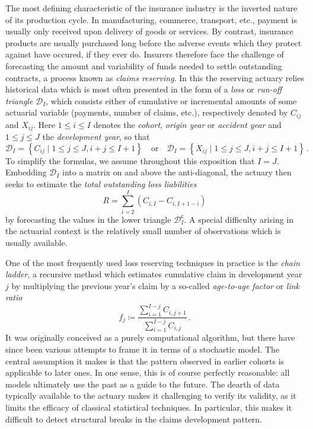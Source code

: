 \documentclass[a4paper]{book}
\theoremstyle{plain}
\begin{document}
The most defining characteristic of the insurance industry is the inverted nature of its production cycle. In manufacturing, commerce, transport, etc., payment is usually only received upon delivery of goods or services. By contrast, insurance products are usually purchased long before the adverse events which they protect against have occured, if they ever do. Insurers therefore face the challenge of forecasting the amount and variability of funds needed to settle outstanding contracts, a process known as \emph{claims reserving}. In this the reserving actuary relies historical data which is most often presented in the form of a \emph{loss} or \emph{run-off triangle} $\mathcal{D}_I$, which consists either of cumulative or incremental amounts of some actuarial variable (payments, number of claims, etc.), respectively denoted by $C_{ij}$ and $X_{ij}$. Here $1 \leq i \leq I$ denotes the \emph{cohort}, \emph{origin year} or \emph {accident year} and $1 \leq j \leq J$ the \emph{development year}, so that
\begin{equation}
    \mathcal{D}_I = \left  \{ C_{ij} \mid 1 \leq j \leq J, i + j \leq I + 1 \right \} 
    \quad \text{or} \quad 
    \mathcal{D}_I = \left  \{ X_{ij} \mid 1 \leq j \leq J, i + j \leq I + 1 \right \} \,.
\end{equation}
To simplify the formulas, we assume throughout this exposition that $I = J$. Embedding $\mathcal{D}_I$ into a matrix on and above the anti-diagonal, the actuary then seeks to estimate the \emph{total outstanding loss liabilities}
\begin{equation}
    R = \sum_{i = 2}^I (C_{i, I} - C_{i, I + 1- i})
\end{equation}
by forecasting the values in the lower triangle $\mathcal{D}^{\mathsf{c}}_I$. A special difficulty arising in the actuarial context is the relatively small number of observations which is usually available.

One of the most frequently used loss reserving techniques in practice is the \emph{chain ladder}, a recursive method which estimates cumulative claim in development year $j$ by multiplying the previous year's claim by a so-called \emph{age-to-age factor} or \emph{link ratio}
\begin{equation}
    f_j \coloneqq \frac{\sum_{i=1}^{I - j} C_{i, j + 1}}{\sum_{i=1}^{I - j} C_{i, j}} \,.
\end{equation}
It was originally conceived as a purely computational algorithm, but there have since been various attempts to frame it in terms of a stochastic model. The central assumption it makes is that the pattern observed in earlier cohorts is applicable to later ones. In one sense, this is of course perfectly reasonable: all models ultimately use the past as a guide to the future. The dearth of data typically available to the actuary makes it challenging to verify its validity, as it limits the efficacy of classical statistical techniques. In particular, this makes it difficult to detect structural breaks in the claims development pattern.
\end{document}
